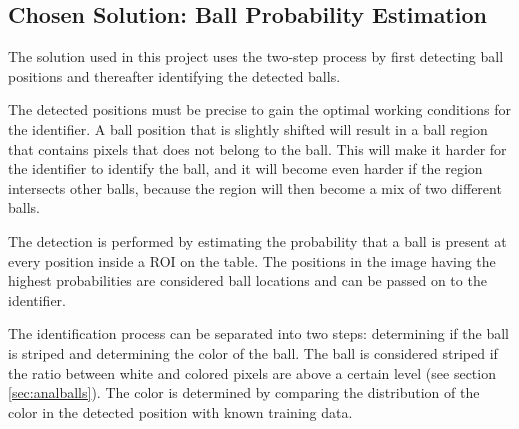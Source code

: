 \subsection{Chosen Solution: Ball Probability Estimation}
The solution used in this project uses the two-step process by first detecting ball positions and thereafter identifying the detected balls.

The detected positions must be precise to gain the optimal working conditions for the identifier. A ball position that is slightly shifted will result in a ball region that contains pixels that does not belong to the ball. This will make it harder for the identifier to identify the ball, and it will become even harder if the region intersects other balls, because the region will then become a mix of two different balls. 

The detection is performed by estimating the probability that a ball is present at every position inside a ROI on the table. The positions in the image having the highest probabilities are considered ball locations and can be passed on to the identifier.

The identification process can be separated into two steps: determining if the ball is striped and determining the color of the ball. The ball is considered striped if the ratio between white and colored pixels are above a certain level (see section \ref{sec:analballs}). The color is determined by comparing the distribution of the color in the detected position with known training data.